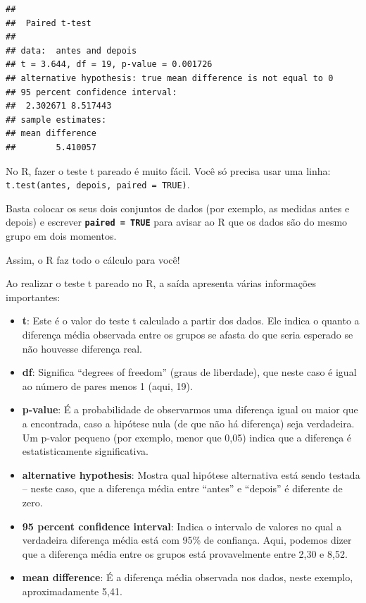 \documentclass[
]{book}
\providecommand{\tightlist}{%
  \setlength{\itemsep}{0pt}\setlength{\parskip}{0pt}}
\begin{document}
\begin{verbatim}
## 
##  Paired t-test
## 
## data:  antes and depois
## t = 3.644, df = 19, p-value = 0.001726
## alternative hypothesis: true mean difference is not equal to 0
## 95 percent confidence interval:
##  2.302671 8.517443
## sample estimates:
## mean difference 
##        5.410057
\end{verbatim}

No R, fazer o teste t pareado é muito fácil. Você só precisa usar uma linha: \texttt{t.test(antes,\ depois,\ paired\ =\ TRUE)}.

Basta colocar os seus dois conjuntos de dados (por exemplo, as medidas antes e depois) e escrever \textbf{\texttt{paired\ =\ TRUE}} para avisar ao R que os dados são do mesmo grupo em dois momentos.

Assim, o R faz todo o cálculo para você!

Ao realizar o teste t pareado no R, a saída apresenta várias informações importantes:

\begin{itemize}
\tightlist
\item
  \textbf{t}: Este é o valor do teste t calculado a partir dos dados. Ele indica o quanto a diferença média observada entre os grupos se afasta do que seria esperado se não houvesse diferença real.
\item
  \textbf{df}: Significa ``degrees of freedom'' (graus de liberdade), que neste caso é igual ao número de pares menos 1 (aqui, 19).
\item
  \textbf{p-value}: É a probabilidade de observarmos uma diferença igual ou maior que a encontrada, caso a hipótese nula (de que não há diferença) seja verdadeira. Um p-valor pequeno (por exemplo, menor que 0,05) indica que a diferença é estatisticamente significativa.
\item
  \textbf{alternative hypothesis}: Mostra qual hipótese alternativa está sendo testada -- neste caso, que a diferença média entre ``antes'' e ``depois'' é diferente de zero.
\item
  \textbf{95 percent confidence interval}: Indica o intervalo de valores no qual a verdadeira diferença média está com 95\% de confiança. Aqui, podemos dizer que a diferença média entre os grupos está provavelmente entre 2,30 e 8,52.
\item
  \textbf{mean difference}: É a diferença média observada nos dados, neste exemplo, aproximadamente 5,41.
\end{itemize}
\end{document}

